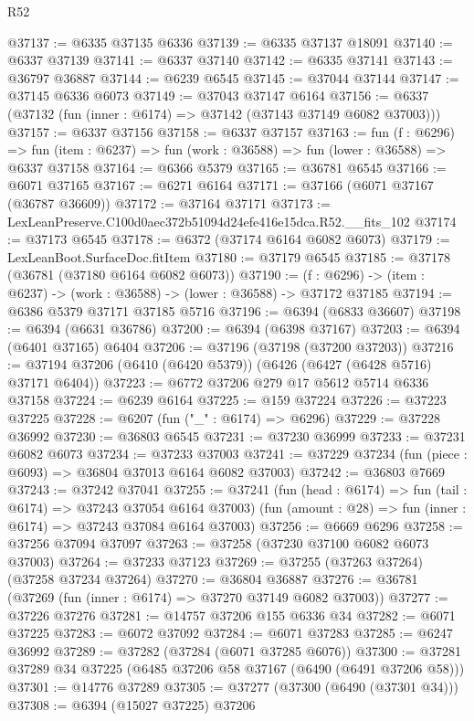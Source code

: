 \begin{lexlean}{R52}
\begin{coremodule}
@37137 := @6335 @37135 @6336
@37139 := @6335 @37137 @18091
@37140 := @6337 @37139
@37141 := @6337 @37140
@37142 := @6335 @37141
@37143 := @36797 @36887
@37144 := @6239 @6545
@37145 := @37044 @37144
@37147 := @37145 @6336 @6073
@37149 := @37043 @37147 @6164
@37156 := @6337 (@37132 (fun (inner : @6174) => @37142 (@37143 @37149 @6082 @37003)))
@37157 := @6337 @37156
@37158 := @6337 @37157
@37163 := fun (f : @6296) =>
  fun (item : @6237) => fun (work : @36588) => fun (lower : @36588) => @6337 @37158
@37164 := @6366 @5379
@37165 := @36781 @6545
@37166 := @6071 @37165
@37167 := @6271 @6164
@37171 := @37166 (@6071 @37167 (@36787 @36609))
@37172 := @37164 @37171
@37173 := LexLeanPreserve.C100d0aec372b51094d24efe416e15dca.R52.__fits_102
@37174 := @37173 @6545
@37178 := @6372 (@37174 @6164 @6082 @6073)
@37179 := LexLeanBoot.SurfaceDoc.fitItem
@37180 := @37179 @6545
@37185 := @37178 (@36781 (@37180 @6164 @6082 @6073))
@37190 := (f : @6296) -> (item : @6237) -> (work : @36588) -> (lower : @36588) -> @37172 @37185
@37194 := @6386 @5379 @37171 @37185 @5716
@37196 := @6394 (@6833 @36607)
@37198 := @6394 (@6631 @36786)
@37200 := @6394 (@6398 @37167)
@37203 := @6394 (@6401 @37165) @6404
@37206 := @37196 (@37198 (@37200 @37203))
@37216 := @37194 @37206 (@6410 (@6420 @5379)) (@6426 (@6427 (@6428 @5716) @37171 @6404))
@37223 := @6772 @37206 @279 @17 @5612 @5714 @6336 @37158
@37224 := @6239 @6164
@37225 := @159 @37224
@37226 := @37223 @37225
@37228 := @6207 (fun ("_" : @6174) => @6296)
@37229 := @37228 @36992
@37230 := @36803 @6545
@37231 := @37230 @36999
@37233 := @37231 @6082 @6073
@37234 := @37233 @37003
@37241 := @37229 @37234 (fun (piece : @6093) => @36804 @37013 @6164 @6082 @37003)
@37242 := @36803 @7669
@37243 := @37242 @37041
@37255 := @37241
    (fun (head : @6174) => fun (tail : @6174) => @37243 @37054 @6164 @37003)
    (fun (amount : @28) => fun (inner : @6174) => @37243 @37084 @6164 @37003)
@37256 := @6669 @6296
@37258 := @37256 @37094 @37097
@37263 := @37258 (@37230 @37100 @6082 @6073 @37003)
@37264 := @37233 @37123
@37269 := @37255 (@37263 @37264) (@37258 @37234 @37264)
@37270 := @36804 @36887
@37276 := @36781 (@37269 (fun (inner : @6174) => @37270 @37149 @6082 @37003))
@37277 := @37226 @37276
@37281 := @14757 @37206 @155 @6336 @34
@37282 := @6071 @37225
@37283 := @6072 @37092
@37284 := @6071 @37283
@37285 := @6247 @36992
@37289 := @37282 (@37284 (@6071 @37285 @6076))
@37300 := @37281 @37289 @34 @37225 (@6485 @37206 @58 @37167 (@6490 (@6491 @37206 @58)))
@37301 := @14776 @37289
@37305 := @37277 (@37300 (@6490 (@37301 @34)))
@37308 := @6394 (@15027 @37225) @37206

\end{coremodule}
\end{lexlean}
